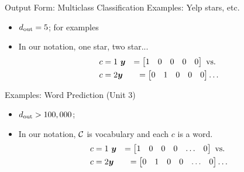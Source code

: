 \documentclass{beamer}
\begin{document}
  





\begin{frame}{Output Form: Multiclass Classification}
  Examples: Yelp stars, etc.
  \begin{itemize}
  \item ${d_{\mathrm{out}}} = 5$; for examples
  \item In our notation, one star, two star...
    \begin{eqnarray*} 
    c = 1 & \  \boldsymbol{y} &= \begin{bmatrix} 1 & 0 & 0 & 0 & 0  \end{bmatrix}  \mathrm {\ vs. \ } \\
    c = 2 & \boldsymbol{y} &=    \begin{bmatrix} 0 & 1 & 0 & 0 & 0 \end{bmatrix} \ldots
   \end{eqnarray*} 
  \end{itemize}
  Examples: Word Prediction (Unit 3)
  \begin{itemize}
  \item ${d_{\mathrm{out}}} > 100,000$; 
  \item In our notation, $\mathcal{C}$ is vocabulary and each $c$ is a word.   
    \begin{eqnarray*} 
    c = 1 & \  \boldsymbol{y} &= \begin{bmatrix} 1 & 0 & 0 & 0 & \ldots & 0  \end{bmatrix}  \mathrm {\ vs. \ } \\
    c = 2 & \boldsymbol{y} &=    \begin{bmatrix} 0 & 1 & 0 & 0 & \ldots & 0 \end{bmatrix} \ldots
   \end{eqnarray*} 
  \end{itemize}
\end{frame}
\end{document}
